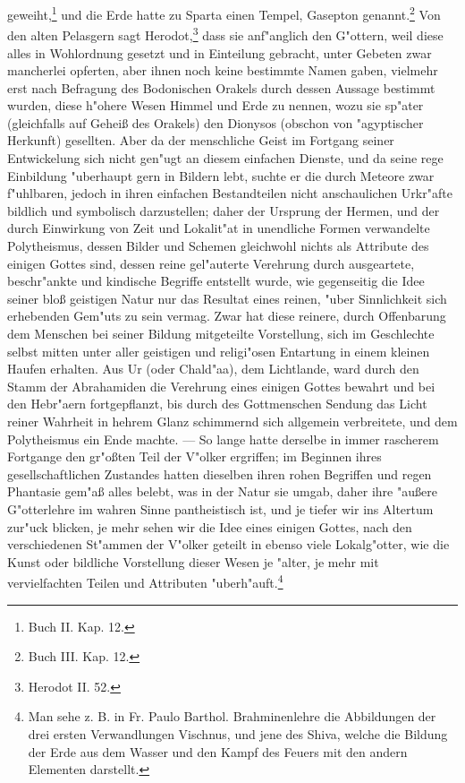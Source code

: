\documentclass[a4paper, 11pt, oneside, polutonikogreek, german]{article}
\begin{document}
geweiht,\footnote{Buch II. Kap. 12.} und die Erde hatte zu Sparta einen Tempel, Gasepton genannt.\footnote{Buch III. Kap. 12.} Von den alten Pelasgern sagt Herodot,\footnote{Herodot II. 52.} dass sie anf"anglich den G"ottern, weil diese alles in Wohlordnung gesetzt und in Einteilung gebracht, unter Gebeten zwar mancherlei opferten, aber ihnen noch keine bestimmte Namen gaben, vielmehr erst nach Befragung des Bodonischen Orakels durch dessen Aussage bestimmt wurden, diese h"ohere Wesen Himmel und Erde zu nennen, wozu sie sp"ater (gleichfalls auf Geheiß des Orakels) den Dionysos (obschon von "agyptischer Herkunft) gesellten. Aber da der menschliche Geist im Fortgang seiner Entwickelung sich nicht gen"ugt an diesem einfachen Dienste, und da seine rege Einbildung "uberhaupt gern in Bildern lebt, suchte er die durch Meteore zwar f"uhlbaren, jedoch in ihren einfachen Bestandteilen nicht anschaulichen Urkr"afte bildlich und symbolisch darzustellen; daher der Ursprung der Hermen, und der durch Einwirkung von Zeit und Lokalit"at in unendliche Formen verwandelte Polytheismus, dessen Bilder und Schemen gleichwohl nichts als Attribute des einigen Gottes sind, dessen reine gel"auterte Verehrung durch ausgeartete, beschr"ankte und kindische Begriffe entstellt wurde, wie gegenseitig die Idee seiner bloß geistigen Natur nur das Resultat eines reinen, "uber Sinnlichkeit sich erhebenden Gem"uts zu sein vermag. Zwar hat diese reinere, durch Offenbarung dem Menschen bei seiner Bildung mitgeteilte Vorstellung, sich im Geschlechte selbst mitten unter aller geistigen und religi"osen Entartung in einem kleinen Haufen erhalten. Aus Ur (oder Chald"aa), dem Lichtlande, ward durch den Stamm der Abrahamiden die Verehrung eines einigen Gottes bewahrt und bei den Hebr"aern fortgepflanzt, bis durch des Gottmenschen Sendung das Licht reiner Wahrheit in hehrem Glanz schimmernd sich allgemein verbreitete, und dem Polytheismus ein Ende machte. --- So lange hatte derselbe in immer rascherem Fortgange den gr"oßten Teil der V"olker ergriffen; im Beginnen ihres gesellschaftlichen Zustandes hatten dieselben ihren rohen Begriffen und regen Phantasie gem"aß alles belebt, was in der Natur sie umgab, daher ihre "außere G"otterlehre im wahren Sinne pantheistisch ist, und je tiefer wir ins Altertum zur"uck blicken, je mehr sehen wir die Idee eines einigen Gottes, nach den verschiedenen St"ammen der V"olker geteilt in ebenso viele Lokalg"otter, wie die Kunst oder bildliche Vorstellung dieser Wesen je "alter, je mehr mit vervielfachten Teilen und Attributen "uberh"auft.\footnote{Man sehe z. B. in Fr. Paulo Barthol. Brahminenlehre die Abbildungen der drei ersten Verwandlungen Vischnus, und jene des Shiva, welche die Bildung der Erde aus dem Wasser und den Kampf des Feuers mit den andern Elementen darstellt.}
\end{document}
